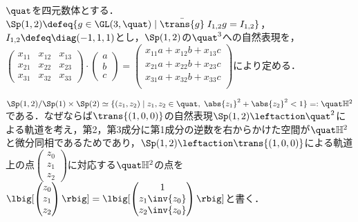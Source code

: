 \begin{nttdef}
  
  $\quat$を四元数体とする．${\Sp(1,2)\defeq \{g\in \GL(3,\quat)\mid \bar{\trans{g}}\; I_{1,2}g = I_{1,2}  \}} $，$I_{1,2} \defeq \diag(-1,1,1) $とし，$\Sp(1,2) $の$\quat^3 $への自然表現を，$
  \begin{pmatrix}
    x_{11} & x_{12} & x_{13}\\ x_{21} & x_{22} & x_{23}\\ x_{31} & x_{32} & x_{33}
  \end{pmatrix}\cdot
  \begin{pmatrix}
    a \\ b \\c
  \end{pmatrix}
  =
  \begin{pmatrix}
    x_{11}a + x_{12}b + x_{13}c\\ x_{21}a + x_{22}b + x_{23}c\\ x_{31}a + x_{32}b + x_{33}c\\    
  \end{pmatrix}
  $により定める．
  
  $\Sp(1,2)/\Sp(1)\times \Sp(2) \simeq \{(z_1, z_2)\mid z_1,z_2\in \quat ,\; \abs{z_1}^2 + \abs{z_2}^2   < 1 \} =: \quat\mathbb{H}^2 $である．なぜならば$\trans{(1,0,0)} $の自然表現$\Sp(1,2)\leftaction \quat^2 $による軌道を考え，第2，第3成分に第1成分の逆数を右からかけた空間が$\quat\mathbb{H}^2$と微分同相であるためであり，$\Sp(1,2)\leftaction \trans{(1,0,0)} $による軌道上の点$
  \begin{pmatrix}
    z_0 \\ z_1 \\ z_2 
  \end{pmatrix}
  $に対応する$\quat\mathbb{H}^2$の点を$
  \lbig[ \begin{pmatrix}
    z_0 \\ z_1 \\ z_2 
  \end{pmatrix}\rbig] = \lbig[ \begin{pmatrix}
    1 \\ z_1\inv{z_0} \\ z_2\inv{z_0} 
  \end{pmatrix}\rbig] 
  $と書く．
\end{nttdef}

